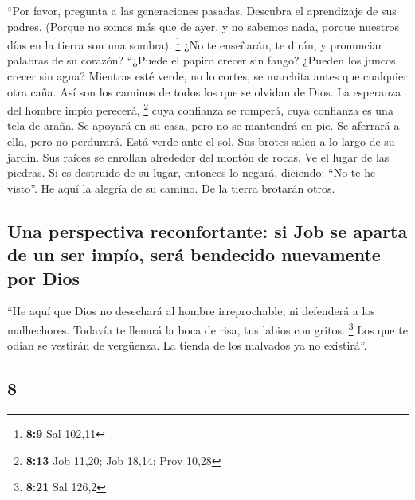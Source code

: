 \begin{paracol}{2}
 ``Por favor, pregunta a las generaciones pasadas.
Descubra el aprendizaje de sus padres.  (Porque no somos
más que de ayer, y no sabemos nada, porque nuestros días en la tierra
son una sombra). \footnote{\textbf{8:9} Sal 102,11}  ¿No
te enseñarán, te dirán, y pronunciar palabras de su corazón?
 ``¿Puede el papiro crecer sin fango? ¿Pueden los juncos
crecer sin agua?  Mientras esté verde, no lo cortes, se
marchita antes que cualquier otra caña.  Así son los
caminos de todos los que se olvidan de Dios. La esperanza del hombre
impío perecerá, \footnote{\textbf{8:13} Job 11,20; Job 18,14; Prov 10,28}
 cuya confianza se romperá, cuya confianza es una tela de
araña.  Se apoyará en su casa, pero no se mantendrá en
pie. Se aferrará a ella, pero no perdurará.  Está verde
ante el sol. Sus brotes salen a lo largo de su jardín. 
Sus raíces se enrollan alrededor del montón de rocas. Ve el lugar de las
piedras.  Si es destruido de su lugar, entonces lo
negará, diciendo: ``No te he visto''.  He aquí la alegría
de su camino. De la tierra brotarán otros.

\hypertarget{una-perspectiva-reconfortante-si-job-se-aparta-de-un-ser-impuxedo-seruxe1-bendecido-nuevamente-por-dios}{%
\subsection{Una perspectiva reconfortante: si Job se aparta de un ser
impío, será bendecido nuevamente por
Dios}\label{una-perspectiva-reconfortante-si-job-se-aparta-de-un-ser-impuxedo-seruxe1-bendecido-nuevamente-por-dios}}

 ``He aquí que Dios no desechará al hombre irreprochable,
ni defenderá a los malhechores.  Todavía te llenará la
boca de risa, tus labios con gritos. \footnote{\textbf{8:21} Sal 126,2}
 Los que te odian se vestirán de vergüenza. La tienda de
los malvados ya no existirá''.

\switchcolumn
\begin{otherlanguage}{english}

\hypertarget{section-15}{%
\section{8}\label{section-15}}


\end{otherlanguage}
\end{paracol}

